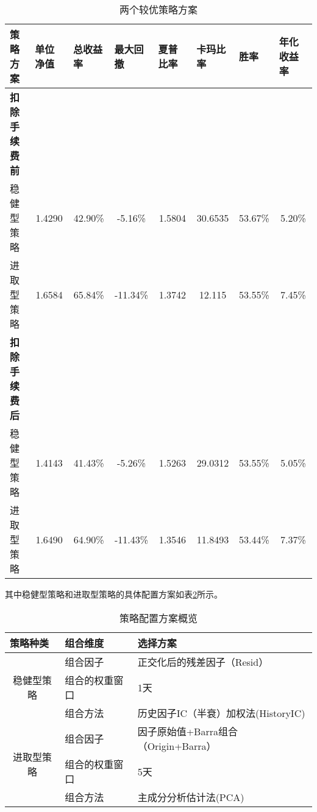\documentclass[11pt]{article}
\begin{document}
\begin{table}[H]
  \centering
  \caption{两个较优策略方案}
    \begin{tabular}{p{6.585em}ccccccc}
    \toprule
    \multicolumn{1}{l}{策略方案} & \multicolumn{1}{l}{单位净值} & \multicolumn{1}{l}{总收益率} & \multicolumn{1}{l}{最大回撤} & \multicolumn{1}{l}{夏普比率} & \multicolumn{1}{l}{卡玛比率} & \multicolumn{1}{l}{胜率} & \multicolumn{1}{l}{年化收益率}\\
    \midrule
    \multicolumn{1}{l}{\textbf{扣除手续费前}} &       &       &       &       &       &       &  \\
    稳健型策略   & 1.4290 & 42.90\% & -5.16\% & 1.5804 & 30.6535 & 53.67\% & 5.20\% \\
    进取型策略   & 1.6584 & 65.84\% & -11.34\% & 1.3742 & 12.115 & 53.55\% & 7.45\% \\
    \hline
    \multicolumn{1}{l}{\textbf{扣除手续费后}} &       &       &       &       &       &       &  \\
    稳健型策略   & 1.4143 & 41.43\% & -5.26\% & 1.5263 & 29.0312 & 53.55\% & 5.05\% \\
    进取型策略   & 1.6490 & 64.90\% & -11.43\% & 1.3546 & 11.8493 & 53.44\% & 7.37\% \\
    \bottomrule
    \end{tabular}%
  \label{tab:strategy}%
\end{table}%

其中稳健型策略和进取型策略的具体配置方案如表\ref{tab:strategyinfo}所示。

\begin{table}[H]
  \centering
  \caption{策略配置方案概览}
    \begin{tabular}{cll}
    \toprule
    \multicolumn{1}{l}{策略种类} & 组合维度  & 选择方案 \\
    \midrule
    \multirow{3}[2]{*}{稳健型策略} & 组合因子 & 正交化后的残差因子（Resid） \\
          & 组合的权重窗口 & 1天 \\
          & 组合方法  & 历史因子IC（半衰）加权法(HistoryIC)\\
    \hline
    \multirow{3}[2]{*}{进取型策略} & 组合因子 & 因子原始值+Barra组合（Origin+Barra）\\
          & 组合的权重窗口 & 5天 \\
          & 组合方法  & 主成分分析估计法(PCA) \\
    \bottomrule
    \end{tabular}%
  \label{tab:strategyinfo}%
\end{table}%
\end{document}
